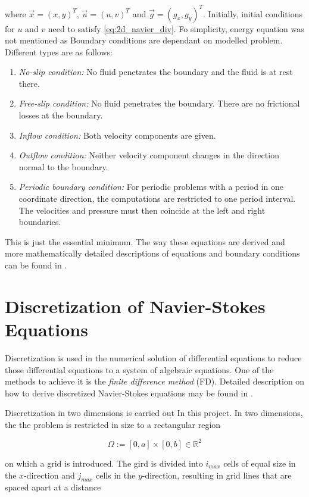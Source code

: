 where $ \overrightarrow{x} = (x, y)^T $, $ \overrightarrow{u} = (u, v)^T $ and $ \overrightarrow{g} = (g_x, g_y)^T $.\cite{griebel1998numerical}
Initially, initial conditions for $u$ and $v$ need to satisfy \ref{eq:2d_navier_div}. Fo simplicity, energy equation was not mentioned as Boundary conditions are dependant on modelled problem. Different types are as follows:
\begin{enumerate}
\item \emph{No-slip condition:} No fluid penetrates the boundary and the fluid is at rest there.
\item \emph{Free-slip condition:} No fluid penetrates the boundary. There are no frictional losses at the boundary.
\item \emph{Inflow condition:} Both velocity components are given.
\item \emph{Outflow condition:} Neither velocity component changes in the direction normal to the boundary.
\item \emph{Periodic boundary condition:} For periodic problems with a period in one coordinate direction, the computations are restricted to one period interval. The velocities and pressure must then coincide at the left and right boundaries.
\end{enumerate}

This is just the essential minimum. The way these equations are derived and more mathematically detailed descriptions of equations and boundary conditions can be found in \cite{griebel1998numerical}.

\section{Discretization of Navier-Stokes Equations}
Discretization is used in the numerical solution of differential equations to reduce those differential equations to a system of algebraic equations. One of the methods to achieve it is the \emph{finite difference method} (FD). Detailed description on how to derive discretized Navier-Stokes equations may be found in \cite{griebel1998numerical}.

Discretization in two dimensions is carried out In this project. In two dimensions, the the problem is restricted in size to a rectangular region

\[
	\Omega := \left [ 0, a \right ] \times \left [ 0, b \right ] \in \mathbb{R}^2
\]

on which a grid is introduced. The gird is divided into $ i_{max}$ cells of equal size in the $x$-direction and $j_{max}$ cells in the $y$-direction, resulting in grid lines that are spaced apart at a distance

